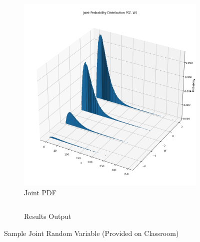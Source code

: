 \documentclass{article}
\begin{document}
\begin{figure}[H]
  \hfill
  \begin{subfigure}{0.45\textwidth}
    \centering
    \includegraphics[width=\linewidth]{results/section3/a(2).png}
    \caption{Joint PDF}
  \end{subfigure}
  \begin{subfigure}{\textwidth}
    \inputminted{text}{results/section3/a.txt}
    \caption{Results Output}
  \end{subfigure}
  \caption{Sample Joint Random Variable (Provided on Classroom)}
\end{figure}
\newpage
\end{document}
